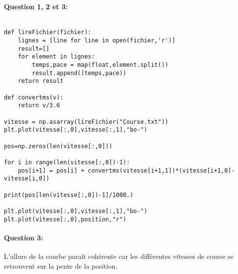 \paragraph{Question 1, 2 et 3:}

\begin{verbatim}

def lireFichier(fichier):
    lignes = [line for line in open(fichier,'r')]
    result=[]
    for element in lignes:
        temps,pace = map(float,element.split())
        result.append((temps,pace))
    return result

def convertms(v):
    return v/3.6

vitesse = np.asarray(lireFichier("Course.txt"))
plt.plot(vitesse[:,0],vitesse[:,1],"bo-")

pos=np.zeros(len(vitesse[:,0]))

for i in range(len(vitesse[:,0])-1):
    pos[i+1] = pos[i] + convertms(vitesse[i+1,1])*(vitesse[i+1,0]-vitesse[i,0])    
    
print(pos[len(vitesse[:,0])-1]/1000.)

plt.plot(vitesse[:,0],vitesse[:,1],"bo-")
plt.plot(vitesse[:,0],position,"r")
\end{verbatim}

\paragraph{Question 3:} L'allure de la courbe paraît cohérente car les différentes vitesses de course se retrouvent sur la pente de la position.



